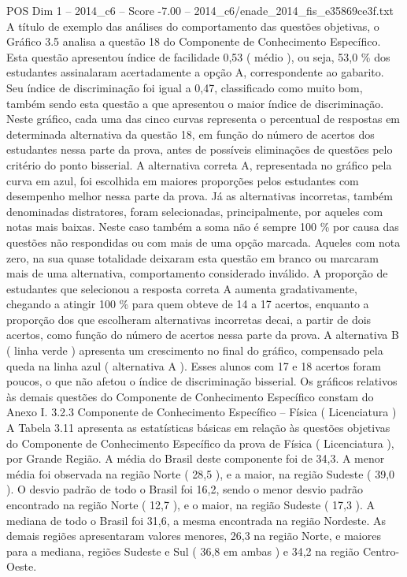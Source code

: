 \begin{textsample}{POS Dim 1 – 2014\_c6 – Score -7.00 – 2014\_c6/enade\_2014\_fis\_e35869ce3f.txt}
A título de exemplo das análises do comportamento das questões objetivas, o Gráfico 3.5 analisa a questão 18 do Componente de Conhecimento Específico.
Esta questão apresentou índice de facilidade 0,53 ( médio ), ou seja, 53,0 \% dos estudantes assinalaram acertadamente a opção A, correspondente ao gabarito.
Seu índice de discriminação foi igual a 0,47, classificado como muito bom, também sendo esta questão a que apresentou o maior índice de discriminação.
Neste gráfico, cada uma das cinco curvas representa o percentual de respostas em determinada alternativa da questão 18, em função do número de acertos dos estudantes nessa parte da prova, antes de possíveis eliminações de questões pelo critério do ponto bisserial.
A alternativa correta A, representada no gráfico pela curva em azul, foi escolhida em maiores proporções pelos estudantes com desempenho melhor nessa parte da prova.
Já as alternativas incorretas, também denominadas distratores, foram selecionadas, principalmente, por aqueles com notas mais baixas.
Neste caso também a soma não é sempre 100 \% por causa das questões não respondidas ou com mais de uma opção marcada.
Aqueles com nota zero, na sua quase totalidade deixaram esta questão em branco ou marcaram mais de uma alternativa, comportamento considerado inválido.
A proporção de estudantes que selecionou a resposta correta A aumenta gradativamente, chegando a atingir 100 \% para quem obteve de 14 a 17 acertos, enquanto a proporção dos que escolheram alternativas incorretas decai, a partir de dois acertos, como função do número de acertos nessa parte da prova.
A alternativa B ( linha verde ) apresenta um crescimento no final do gráfico, compensado pela queda na linha azul ( alternativa A ).
Esses alunos com 17 e 18 acertos foram poucos, o que não afetou o índice de discriminação bisserial.
Os gráficos relativos às demais questões do Componente de Conhecimento Específico constam do Anexo I. 3.2.3 Componente de Conhecimento Específico – Física ( Licenciatura ) A Tabela 3.11 apresenta as estatísticas básicas em relação às questões objetivas do Componente de Conhecimento Específico da prova de Física ( Licenciatura ), por Grande Região.
A média do Brasil deste componente foi de 34,3.
A menor média foi observada na região Norte ( 28,5 ), e a maior, na região Sudeste ( 39,0 ).
O desvio padrão de todo o Brasil foi 16,2, sendo o menor desvio padrão encontrado na região Norte ( 12,7 ), e o maior, na região Sudeste ( 17,3 ).
A mediana de todo o Brasil foi 31,6, a mesma encontrada na região Nordeste.
As demais regiões apresentaram valores menores, 26,3 na região Norte, e maiores para a mediana, regiões Sudeste e Sul ( 36,8 em ambas ) e 34,2 na região Centro-Oeste.

\end{textsample}
